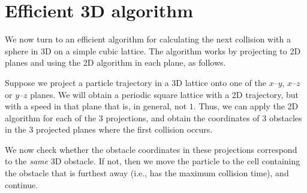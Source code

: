 \documentclass{iopart}
\begin{document}
%
%

\section{Efficient 3D algorithm}

We now turn to an efficient algorithm for calculating the next collision with a sphere in 3D on a simple cubic lattice. The algorithm works by projecting to 2D planes and using the 2D algorithm in each plane, as follows.

Suppose we project a particle trajectory in a 3D lattice onto one of the $x$--$y$, $x$--$z$ or 
$y$--$z$ planes. We will obtain a periodic square lattice with a 2D trajectory, but with a speed in that plane that is, in general, not $1$. 
Thus, we can apply the 2D algorithm for each of the 3 projections, and obtain the coordinates of 3 obstacles in the 3 projected planes where the first collision occurs.  

We now check whether the obstacle coordinates in these projections correspond to the \emph{same} 3D obstacle. If not, then we move the particle to the cell containing the obstacle that is furthest away (i.e., has the maximum collision time), and continue.
\end{document}
